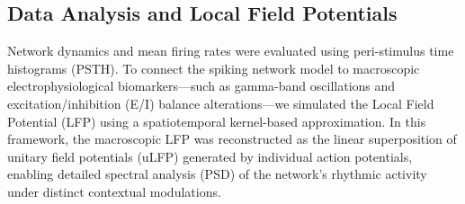 \subsection{Data Analysis and Local Field Potentials}
Network dynamics and mean firing rates were evaluated using peri-stimulus time histograms (PSTH). To connect the spiking network model to macroscopic electrophysiological biomarkers—such as gamma-band oscillations and excitation/inhibition (E/I) balance alterations—we simulated the Local Field Potential (LFP) using a spatiotemporal kernel-based approximation. In this framework, the macroscopic LFP was reconstructed as the linear superposition of unitary field potentials (uLFP) generated by individual action potentials, enabling detailed spectral analysis (PSD) of the network's rhythmic activity under distinct contextual modulations.